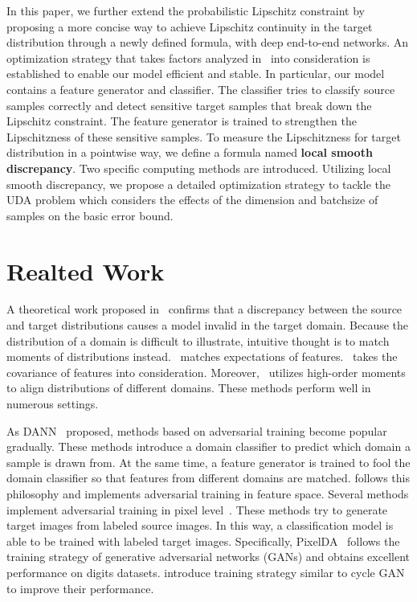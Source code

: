 \documentclass[10pt,twocolumn,letterpaper]{article}
\begin{document}
In this paper, we further extend the probabilistic Lipschitz constraint by  proposing a more concise way to achieve Lipschitz continuity in the target distribution through a newly defined formula, with deep end-to-end networks. An optimization strategy that takes factors analyzed in~\cite{Ben-David2014} into consideration is established to enable our model efficient and stable. In particular, our model contains a feature generator and classifier. The classifier tries to classify source samples correctly and detect sensitive target samples that break down the Lipschitz constraint. The feature generator is trained to strengthen the Lipschitzness of these sensitive samples. To measure the Lipschitzness for target distribution in a pointwise way, we define a formula named {\bf local smooth discrepancy}. Two specific computing methods are introduced. Utilizing local smooth discrepancy, we propose a detailed optimization strategy to tackle the UDA problem which considers the effects of the dimension and batchsize of samples on the basic error bound. 

\section{Realted Work}
\label{relatedworkd}

A theoretical work proposed in~\cite{ben2010theory} confirms that a discrepancy between the source and target distributions causes a model invalid in the target domain. Because the distribution of a domain is difficult to illustrate, intuitive thought is to match moments of distributions instead.~\cite{pmlr-v37-long15} matches expectations of features.~\cite{sun2016deep} takes the covariance of features into consideration. Moreover,~\cite{zellinger2017central} utilizes high-order moments to align distributions of different domains. These methods perform well in numerous settings.

As DANN~\cite{ganin2016domain} proposed, methods based on adversarial training become popular gradually. These methods introduce a domain classifier to predict which domain a sample is drawn from. At the same time, a feature generator is trained to fool the domain classifier so that features from different domains are matched. \cite{tzeng2017adversarial} follows this philosophy and implements adversarial training in feature space. Several methods implement adversarial training in pixel level~\cite{murez2018image,bousmalis2017unsupervised,liu2016coupled}. These methods try to generate target images from labeled source images. In this way, a classification model is able to be trained with labeled target images. Specifically, PixelDA~\cite{bousmalis2017unsupervised} follows the training strategy of generative adversarial networks (GANs) and obtains excellent performance on digits datasets. \cite{murez2018image,liu2016coupled} introduce training strategy similar to cycle GAN to improve their performance.
\end{document}
